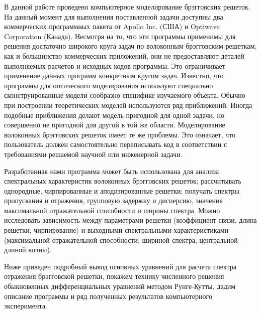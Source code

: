 В данной работе проведено компьютерное моделирование брэгговских решеток. На данный момент для выполнения поставленной задачи доступны два коммерческих программных пакета от Apollo Inc. (США) и Optiwave Corporation (Канада). Несмотря на то, что эти программы применимы для решения достаточно широкого круга задач по волоконным брэгговским решеткам, как и большинство коммерческих приложений, они не предоставляют деталей выполняемых расчетов и исходных кодов программы. Это ограничивает применение данных программ конкретным кругом задач. Известно, что программы для оптического моделирования используют специально сконструированные модели сообразно специфике изучаемого объекта. Обычно при построении теоретических моделей используются ряд приближений. Иногда подобные приближения делают модель пригодной для одной задачи, но совершенно не пригодной для другой в той же области. Моделирование волоконных брэгговских решеток имеет те же проблемы. Это означает, что пользователь должен самостоятельно переписывать код в соответствии с требованиями решаемой научной или инженерной задачи.

Разработанная нами программа может быть использована для анализа спектральных характеристик волоконных брэгговских решеток; рассчитывать однородные, чирпированные и аподизированные решетки; получать спектры пропускания и отражения, групповую задержку и дисперсию, значение максимальной отражательной способности и ширины спектра. Можно исследовать зависимость между параметрами решетки (коэффициент связи, длина решетки, чирпирование) и выходными спектральными характеристиками (максимальной отражательной способности, шириной спектра, центральной длиной волны).

Ниже приведен подробный вывод основных уравнений для расчета спектра отражения брэгговской решетки, покажем технику численного решения обыкновенных дифференциальных уравнений методом Рунге-Кутты, дадим описание программы и ряд полученных результатов компьютерного эксперимента.


